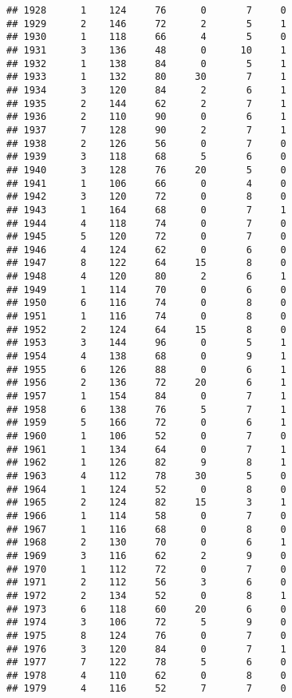 \documentclass[
]{article}
\begin{document}
\begin{verbatim}
## 1928      1    124     76      0       7     0
## 1929      2    146     72      2       5     1
## 1930      1    118     66      4       5     0
## 1931      3    136     48      0      10     1
## 1932      1    138     84      0       5     1
## 1933      1    132     80     30       7     1
## 1934      3    120     84      2       6     1
## 1935      2    144     62      2       7     1
## 1936      2    110     90      0       6     1
## 1937      7    128     90      2       7     1
## 1938      2    126     56      0       7     0
## 1939      3    118     68      5       6     0
## 1940      3    128     76     20       5     0
## 1941      1    106     66      0       4     0
## 1942      3    120     72      0       8     0
## 1943      1    164     68      0       7     1
## 1944      4    118     74      0       7     0
## 1945      5    120     72      0       7     0
## 1946      4    124     62      0       6     0
## 1947      8    122     64     15       8     0
## 1948      4    120     80      2       6     1
## 1949      1    114     70      0       6     0
## 1950      6    116     74      0       8     0
## 1951      1    116     74      0       8     0
## 1952      2    124     64     15       8     0
## 1953      3    144     96      0       5     1
## 1954      4    138     68      0       9     1
## 1955      6    126     88      0       6     1
## 1956      2    136     72     20       6     1
## 1957      1    154     84      0       7     1
## 1958      6    138     76      5       7     1
## 1959      5    166     72      0       6     1
## 1960      1    106     52      0       7     0
## 1961      1    134     64      0       7     1
## 1962      1    126     82      9       8     1
## 1963      4    112     78     30       5     0
## 1964      1    124     52      0       8     0
## 1965      2    124     82     15       3     1
## 1966      1    114     58      0       7     0
## 1967      1    116     68      0       8     0
## 1968      2    130     70      0       6     1
## 1969      3    116     62      2       9     0
## 1970      1    112     72      0       7     0
## 1971      2    112     56      3       6     0
## 1972      2    134     52      0       8     1
## 1973      6    118     60     20       6     0
## 1974      3    106     72      5       9     0
## 1975      8    124     76      0       7     0
## 1976      3    120     84      0       7     1
## 1977      7    122     78      5       6     0
## 1978      4    110     62      0       8     0
## 1979      4    116     52      7       7     0

\end{verbatim}
\end{document}
